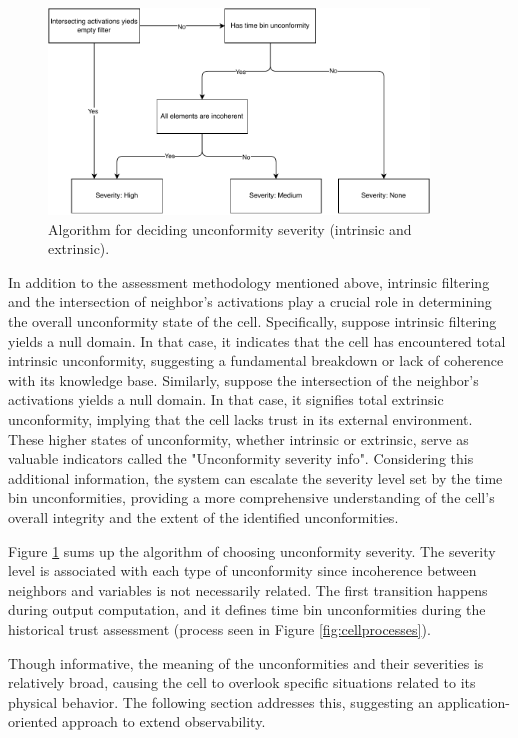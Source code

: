 \begin{figure}[h!]
\centering
    \includegraphics[width=0.9\textwidth]{figures/chapter4/cell/states.pdf}
    \caption{Algorithm for deciding unconformity severity (intrinsic and extrinsic).}
    \label{fig:severity}
\end{figure}

In addition to the assessment methodology mentioned above, intrinsic filtering and the intersection of neighbor's activations play a crucial role in determining the overall unconformity state of the cell. Specifically, suppose intrinsic filtering yields a null domain. In that case, it indicates that the cell has encountered total intrinsic unconformity, suggesting a fundamental breakdown or lack of coherence with its knowledge base. Similarly, suppose the intersection of the neighbor's activations yields a null domain. In that case, it signifies total extrinsic unconformity, implying that the cell lacks trust in its external environment. These higher states of unconformity, whether intrinsic or extrinsic, serve as valuable indicators called the "Unconformity severity info". Considering this additional information, the system can escalate the severity level set by the time bin unconformities, providing a more comprehensive understanding of the cell's overall integrity and the extent of the identified unconformities.

Figure \ref{fig:severity} sums up the algorithm of choosing unconformity severity. The severity level is associated with each type of unconformity since incoherence between neighbors and variables is not necessarily related. The first transition happens during output computation, and it defines time bin unconformities during the historical trust assessment (process seen in Figure \ref{fig:cellprocesses}).

Though informative, the meaning of the unconformities and their severities is relatively broad, causing the cell to overlook specific situations related to its physical behavior. The following section addresses this, suggesting an application-oriented approach to extend observability.

